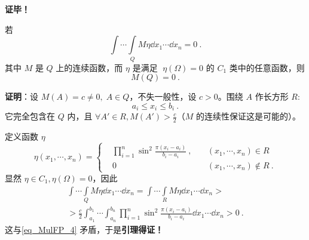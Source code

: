 \textbf{证毕！}

\begin{lemma}{}
若
\begin{equation}\label{eq_MulFP_4}
\int\cdots\int\limits_Q M\eta\dd x_1\cdots\dd x_n=0~.
\end{equation}
其中 $M$ 是 $Q$ 上的连续函数，而 $\eta$ 是满足 $\;\eta(\Omega)=0$  的 $C_1$ 类中的任意函数，则
\begin{equation}
M(Q)=0~.
\end{equation}
\end{lemma}
  \textbf{证明}：设 $M(A)=c\neq0,\;A\in Q$，不失一般性，设 $c>0$。围绕 $A$ 作长方形 $R$:
  \begin{equation}
  a_i\leq x_i\leq b_i~.
  \end{equation}
  它完全包含在 $Q$ 内，且 $\forall A'\in R,M(A')>\frac{c}{2}$（$M$ 的连续性保证这是可能的）。

  定义函数 $\eta$
  \begin{equation}
  \eta(x_1,\cdots,x_n)=\left\{
      \begin{aligned}
      &\prod_{i=1}^n \sin^2\frac{\pi(x_i-a_i)}{b_i-a_i}~,\quad &(x_1,\cdots,x_n)\in R\\
      &0\quad &(x_1,\cdots,x_n)\notin R~.
      \end{aligned}\right.
  \end{equation}
  显然 $\eta\in C_1,\eta(\Omega)=0$，因此
  \begin{equation}
  \begin{aligned}
  \int\cdots\int\limits_Q M\eta\dd x_1\cdots\dd x_n=\int\cdots\int\limits_R M\eta\dd x_1\cdots\dd x_n>\\
  >\frac{c}{2}\int_{a_1}^{b_1}\cdots\int_{a_n}^{b_n}\prod_{i=1}^n \sin^2\frac{\pi(x_i-a_i)}{b_i-a_i}\dd x_1\cdots\dd x_n>0~.
  \end{aligned}
  \end{equation}
  这与\autoref{eq_MulFP_4} 矛盾，于是\textbf{引理得证！}
